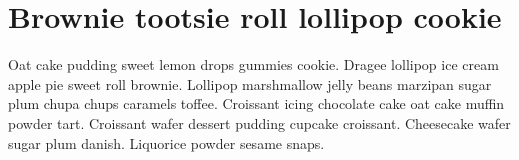 
\appendix

\chapter{Brownie tootsie roll lollipop cookie}
\label{adx:a}

\doublespacing

Oat cake pudding sweet lemon drops gummies cookie. 
Dragee lollipop ice cream apple pie sweet roll brownie. 
Lollipop marshmallow jelly beans marzipan sugar plum chupa chups caramels toffee. 
Croissant icing chocolate cake oat cake muffin powder tart. 
Croissant wafer dessert pudding cupcake croissant. 
Cheesecake wafer sugar plum danish. 
Liquorice powder sesame snaps.
